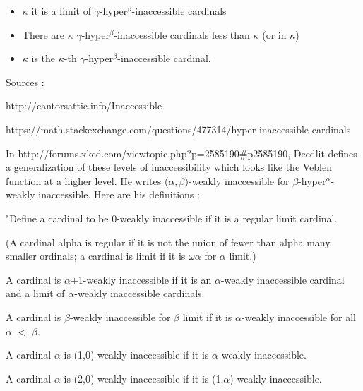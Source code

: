 \documentclass[10pt]{article}
\begin{document}
\begin{itemize}
     \setlength{\itemsep}{1pt}
     \setlength{\parskip}{0pt}
     \setlength{\parsep}{0pt}

\item \(\kappa\)  it is a limit of \(\gamma\)-hyper\(^\beta\)-inaccessible cardinals

\item There are \(\kappa\) \(\gamma\)-hyper\(^\beta\)-inaccessible cardinals less than \(\kappa\) (or in \(\kappa\))

\item \(\kappa\) is the \(\kappa\)-th \(\gamma\)-hyper\(^\beta\)-inaccessible cardinal.

\end{itemize}

Sources : 

http://cantorsattic.info/Inaccessible

https://math.stackexchange.com/questions/477314/hyper-inaccessible-cardinals

\bigskip

In http://forums.xkcd.com/viewtopic.php?p=2585190\#p2585190, Deedlit defines a generalization of these levels of inaccessibility which looks like the Veblen function at a higher level. He writes (\(\alpha,\beta)\)-weakly inaccessible for \(\beta\)-hyper\(^\alpha\)-weakly inaccessible. Here are his definitions :

\bigskip

"Define a cardinal to be 0-weakly inaccessible if it is a regular limit cardinal.

(A cardinal alpha is regular if it is not the union of fewer than alpha many smaller ordinals;
a cardinal is limit if it is \(\omega\)\(\alpha\) for \(\alpha\) limit.)

\bigskip

A cardinal is \(\alpha\)+1-weakly inaccessible if it is an \(\alpha\)-weakly inaccessible cardinal and a limit of \(\alpha\)-weakly inaccessible cardinals.

A cardinal is \(\beta\)-weakly inaccessible for \(\beta\) limit if it is \(\alpha\)-weakly inaccessible for all \(\alpha\) \(<\) \(\beta\).

\bigskip

A cardinal \(\alpha\) is (1,0)-weakly inaccessible if it is \(\alpha\)-weakly inaccessible.

A cardinal \(\alpha\) is (2,0)-weakly inaccessible if it is (1,\(\alpha\))-weakly inaccessible.
\end{document}
